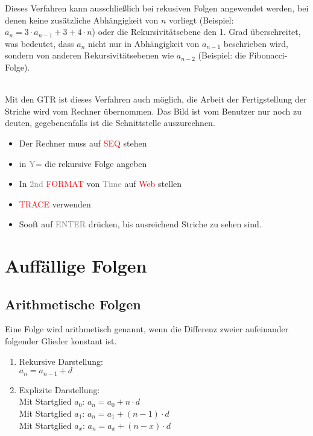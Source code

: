 \begin{Bemerkung}
Dieses Verfahren kann ausschließlich bei rekusiven Folgen angewendet werden, bei denen keine zusätzliche Abhängigkeit von $n$ vorliegt (Beispiel: $a_{n}=3\cdot a_{n-1}+3+4\cdot n$) oder die Rekursivitätsebene den 1. Grad überschreitet, was bedeutet, dass $a_{n}$ nicht nur in Abhängigkeit von $a_{n-1}$ beschrieben wird, sondern von anderen Rekursivitätsebenen wie $a_{n-2}$ (Beispiel: die Fibonacci-Folge).\\
\end{Bemerkung}

\begin{GTR-Tipp}
\\
Mit den GTR ist dieses Verfahren auch möglich, die Arbeit der Fertigstellung der Striche wird vom Rechner übernommen. Das Bild ist vom Benutzer nur noch zu deuten, gegebenenfalls ist die Schnittstelle auszurechnen.
\begin{itemize}
\item Der Rechner muss auf \textcolor{red}{SEQ} stehen
\item in \textcolor{gray}{Y=} die rekursive Folge angeben
\item In \textcolor{gray}{2nd }\textcolor{red}{FORMAT} von \textcolor{gray}{Time} auf \textcolor{red}{Web} stellen
\item \textcolor{red}{TRACE} verwenden
\item Sooft auf \textcolor{gray}{ENTER} drücken, bis ausreichend Striche zu sehen sind.
\end{itemize}

\end{GTR-Tipp}


		\section{Auffällige Folgen}


	\subsection{Arithmetische Folgen}

\begin{Definition}
Eine Folge wird arithmetisch genannt, wenn die Differenz zweier aufeinander folgender Glieder konstant ist.
\begin{enumerate}
\item Rekursive Darstellung:\\
\indent $a_{n}=a_{n-1}+d$
\item Explizite Darstellung:\\
\indent Mit Startglied $a_{0}$: $a_{n}=a_{0}+n\cdot d$\\
\indent Mit Startglied $a_{1}$: $a_{n}=a_{1}+(n-1)\cdot d$\\
\indent Mit Startglied $a_{x}$: $a_{n}=a_{x}+(n-x)\cdot d$
\end{enumerate}
\end{Definition}

